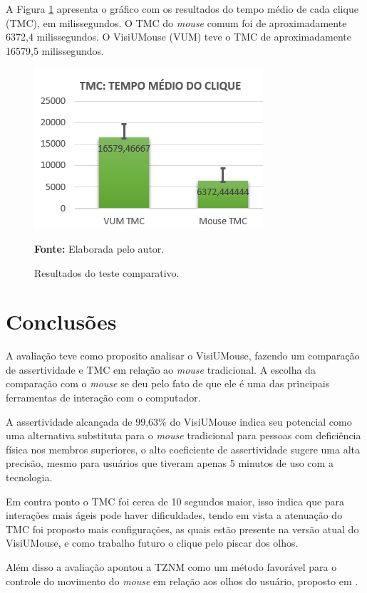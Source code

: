 A Figura \ref{fig:tmc} apresenta o gráfico com os resultados do tempo médio de cada clique (TMC), em milissegundos. O TMC do \textit{mouse} comum foi de aproximadamente 6372,4 milissegundos. O VisiUMouse (VUM) teve o TMC de aproximadamente 16579,5 milissegundos.
\begin{figure}[H]
\caption{Resultados do teste comparativo.} 
\centering \includegraphics[scale=1]{img/tmc2.png}

{\fontsize{11}{11}\selectfont \textbf{Fonte:} Elaborada pelo autor.}
\label{fig:tmc}
\end{figure}

\section{Conclusões}\label{Sub:conclusao-ex-1}

A avaliação teve como proposito analisar o VisiUMouse, fazendo um comparação de assertividade e TMC em relação ao \textit{mouse} tradicional. A escolha da comparação com o \textit{mouse} se deu pelo fato de que ele é uma das principais ferramentas de interação com o computador.

A assertividade alcançada de 99,63\% do VisiUMouse indica seu potencial como uma alternativa substituta para o \textit{mouse} tradicional para pessoas com deficiência física nos membros superiores, o alto coeficiente de assertividade sugere uma alta precisão, mesmo para usuários que tiveram apenas 5 minutos de uso com a tecnologia.

Em contra ponto o TMC foi cerca de 10 segundos maior, isso indica que para interações mais ágeis pode haver dificuldades, tendo em vista a atenuação do TMC foi proposto mais configurações, as quais estão presente na versão atual do VisiUMouse, e como trabalho futuro o clique pelo piscar dos olhos.

Além disso a avaliação apontou a TZNM como um método favorável para o controle do movimento do \textit{mouse} em relação aos olhos do usuário, proposto em \cite{xavier2017visiumouse}.


